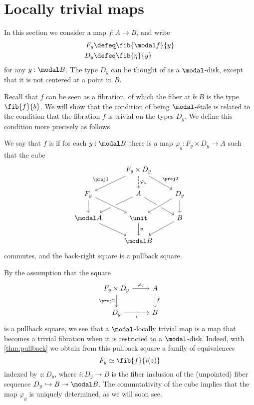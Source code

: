 \documentclass{msc}
\begin{document}
\section{Locally trivial maps}

  In this section we consider a map $f:A\to B$, and write
  \begin{align*}
    F_y & \defeq \fib{\modal f}{y} \\
    D_y & \defeq \fib{\eta}{y}
  \end{align*}
  for any $y:\modal B$. The type $D_y$ can be thought of as a $\modal$-disk, except that it is not centered at a point in $B$.

  Recall that $f$ can be seen as a fibration, of which the fiber at $b:B$ is the type $\fib{f}{b}$. We will show that the condition of being $\modal$-\'etale is related to the condition that the fibration $f$ is trivial on the types $D_y$. We define this condition more precisely as follows.
  
\begin{defn}
 We say that $f$ is  if for each $y:\modal B$ there is a map $\varphi_y:F_y\times D_y \to A$ such that the cube
  \begin{equation*}
    \begin{tikzcd}
      & F_y\times D_y \arrow[dl,swap,"\proj 1"] \arrow[d,dashed,"\varphi_y"] \arrow[dr,"\proj 2"] \\
      F_y \arrow[d] & A \arrow[dl] \arrow[dr] & D_y \arrow[d] \arrow[dl,crossing over] \\
      \modal A \arrow[dr] & \unit \arrow[from=ul,crossing over] \arrow[d,"y"] & B \arrow[dl] \\
      & \modal B
    \end{tikzcd}
  \end{equation*}
  commutes, and the back-right square is a pullback square.
\end{defn}

By the assumption that the square
\begin{equation*}
  \begin{tikzcd}
    F_y\times D_y \arrow[d,swap,"\proj 2"] \arrow[r,"\varphi_y"] & A \arrow[d,"f"] \\
    D_y \arrow[r,swap,"i"] & B
  \end{tikzcd}
\end{equation*}
is a pullback square, we see that a $\modal$-locally trivial map is a map that becomes a trivial fibration when it is restricted to a $\modal$-disk. Indeed, with \cref{thm:pullback} we obtain from this pullback square a family of equivalences
\begin{equation*}
  F_y \simeq \fib{f}{i(z)}
\end{equation*}
indexed by $z:D_y$, where $i:D_y\to B$ is the fiber inclusion of the (unpointed) fiber sequence $D_y\hookrightarrow B\twoheadrightarrow\modal B$. The commutativity of the cube implies that the map $\varphi_y$ is uniquely determined, as we will soon see.
\end{document}
